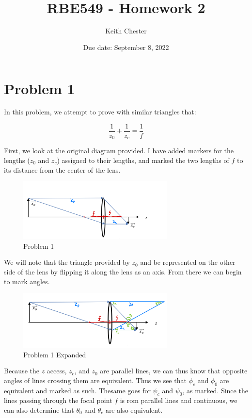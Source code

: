\documentclass{article}
\title{RBE549 - Homework 2}
\author{Keith Chester}
\date{Due date: September 8, 2022}
\begin{document}
\maketitle

\section*{Problem 1}

In this problem, we attempt to prove with similar triangles that:

\begin{equation}
    \frac{1}{z_0} + \frac{1}{z_c} = \frac{1}{f}
\end{equation}

First, we look at the original diagram provided. I have added markers for the lengths ($z_0$ and $z_c$) assigned to their lengths, and marked the two lengths of $f$ to its distance from the center of the lens.

\begin{figure}[H]
    \centering
    \includegraphics[width = 0.7\textwidth]{imgs/prob_1.png}
    \caption{Problem 1}
    \label{fig:prob1}
\end{figure}

We will note that the triangle provided by $z_0$ and be represented on the other side of the lens by flipping it along the lens as an axis. From there we can begin to mark angles.

\begin{figure}[H]
    \centering
    \includegraphics[width = 0.7\textwidth]{imgs/prob_1_expanded.png}
    \caption{Problem 1 Expanded}
    \label{fig:prob1_expanded}
\end{figure}

Because the $z$ access, $z_c$, and $z_0$ are parallel lines, we can thus know that opposite angles of lines crossing them are equivalent. Thus we see that $\phi_c$ and $\phi_0$ are equivalent and marked as such. Thesame goes for $\psi_c$ and $\psi_0$, as marked.  Since the lines passing through the focal point $f$ is rom parallel lines and continuous, we can also determine that $\theta_0$ and $\theta_c$ are also equivalent.
\end{document}
